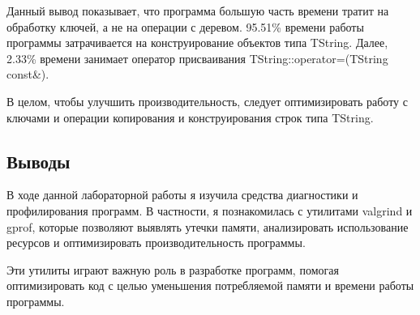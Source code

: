 \documentclass[12pt]{article}
\begin{document}
Данный вывод показывает, что программа большую часть времени тратит на обработку ключей, а не на операции с деревом.
95.51{\%} времени работы программы затрачивается на конструирование объектов типа TString. Далее, 2.33{\%} времени занимает оператор присваивания TString::operator=(TString const&).

В целом, чтобы улучшить производительность, следует оптимизировать работу с ключами и операции копирования и конструирования строк типа TString.


\subsection*{Выводы}

В ходе данной лабораторной работы я изучила средства диагностики и профилирования программ. В частности, я познакомилась с утилитами valgrind и gprof, которые позволяют выявлять утечки памяти, анализировать использование ресурсов и оптимизировать производительность программы.

 Эти утилиты играют важную роль в разработке программ, помогая оптимизировать код с целью уменьшения потребляемой памяти и времени работы программы.
\end{document}
